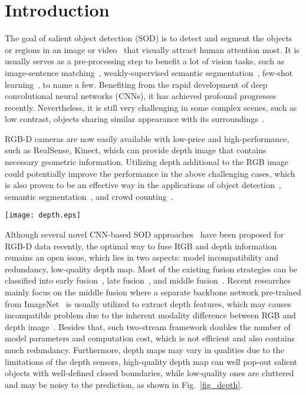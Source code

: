 \documentclass[runningheads]{llncs}
\begin{document}
\section{Introduction}
The goal of salient object detection (SOD) is to detect and segment the objects or regions in an image or video~\cite{fan2019shifting} that visually attract human attention most. It is usually serves as a pre-processing step to benefit a lot of vision tasks, such as image-sentence matching~\cite{Ji_2019_ICCV}, weakly-supervised semantic segmentation~\cite{wei2016stc}, few-shot learning~\cite{zhang2019few}, to name a few. Benefiting from the rapid development of deep convolutional neural networks (CNNs), it has achieved profound progresses recently. Nevertheless, it is still very challenging in some complex scenes, such as low contrast, objects sharing similar appearance with its surroundings~\cite{fan2018salient}.

RGB-D cameras are now easily available with low-price and high-performance, such as RealSense, Kinect, which can provide depth image that contains necessary geometric information. Utilizing depth additional to the RGB image could potentially improve the performance in the above challenging cases, which is also proven to be an effective way in the applications of object detection~\cite{li2018cross}, semantic segmentation~\cite{lin2018scn}, and crowd counting~\cite{lian2019density}.

\begin{figure*}  
  \centering  
  \texttt{[image: depth.eps]}
  \caption{Example RGB images with corresponding depth images. (a) High quality depth images successfully pop out salient objects, thus can be seen as mid-level or high-level feature maps. (b) Low quality depth images are cluttered thus may be harmful for the prediction.}  
  \label{fig_depth}  
\end{figure*}

Although several novel CNN-based SOD approaches~\cite{piao2019depth}\cite{zhao2019contrast} have been proposed for RGB-D data recently, the optimal way to fuse RGB and depth information remains an open issue, which lies in two aspects: model incompatibility and redundancy, low-quality depth map. Most of the existing fusion strategies can be classified into early fusion~\cite{qu2017rgbd}\cite{song2017depth}, late fusion~\cite{han2017cnns}\cite{fan2019rethinking}, and middle fusion~\cite{chen2018progressively}\cite{chen2019multi}\cite{chen2019three}\cite{piao2019depth}. Recent researches mainly focus on the middle fusion where a separate backbone network pre-trained from ImageNet~\cite{deng2009imagenet} is usually utilized to extract depth features, which may causes incompatible  problem due to the inherent modality difference between RGB and depth image~\cite{zhao2019contrast}. Besides that, such two-stream framework doubles the number of model parameters and computation cost, which is not efficient and also contains much redundancy. Furthermore, depth maps may vary in qualities due to the limitations of the depth sensors, high-quality depth map can well pop-out salient objects with well-defined closed boundaries, while low-quality ones are cluttered and may be noisy to the prediction, as shown in Fig.~\ref{fig_depth}.
\end{document}
